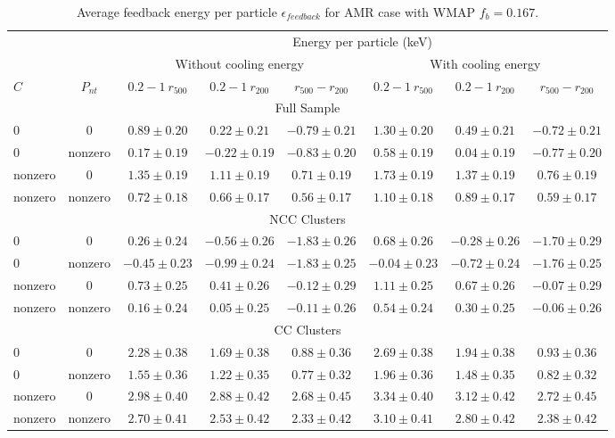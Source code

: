 \documentclass[a4paper,fleqn,usenatbib]{mnras}
\begin{document}
\begin{table*}
 \caption{Average feedback energy per particle $\epsilon_{feedback}$ for AMR case with WMAP $f_{b}=0.167$.}
 \label{amrwmap}
 \begin{tabular}{@{}lccccccc}
  \hline
 &&\multicolumn{6}{c}{Energy per particle (keV) }\\
    \cline{3-8}
&&\multicolumn{3}{c}{Without cooling energy}&\multicolumn{3}{c}{With cooling energy}\\
\cline{3-8}
 $C$    &$P_{nt}$   & $0.2-1~r_{500}$ &   $0.2-1~r_{200}$& $r_{500}-r_{200}$&   $0.2-1~r_{500}$&$0.2-1~r_{200}$&$r_{500}-r_{200}$\\
  \hline
\multicolumn{8}{c}{Full Sample}\\
\hline
 0        &0          &$0.89\pm0.20$    &$ 0.22\pm0.21$  &  $-0.79\pm0.21$  & $1.30\pm0.20$     &$0.49\pm0.21$   & $-0.72\pm0.21$\\
 0        & nonzero   & $0.17\pm0.19$   &$-0.22\pm0.19$  & $-0.83\pm0.20$   & $0.58\pm0.19$    &$0.04\pm0.19$   &  $-0.77\pm0.20$       \\
nonzero   & 0         &$1.35\pm0.19$    &$1.11\pm0.19$   & $ 0.71\pm0.19$    &$1.73\pm0.19$      &$1.37\pm0.19$   &$0.76\pm0.19$\\
nonzero   & nonzero   & $0.72\pm0.18$   &$ 0.66\pm0.17$   &  $0.56\pm0.17$   &$1.10\pm0.18$      &$0.89\pm0.17$   &$0.59\pm0.17$\\
  \hline 
\multicolumn{8}{c}{NCC Clusters}\\
\hline
 0         &0          &$0.26\pm0.24$    & $-0.56\pm0.26$  & $-1.83\pm0.26$ &$ 0.68\pm0.26$     &$-0.28\pm0.26$ &$-1.70\pm0.29$\\
 0         & nonzero   &$-0.45\pm0.23$  &$-0.99\pm0.24$  &$-1.83\pm0.25$  & $-0.04\pm0.23$   &$-0.72\pm0.24$&  $-1.76\pm0.25$       \\
nonzero    & 0         &$0.73\pm0.25$    &$0.41\pm0.26$   & $-0.12\pm0.29$  &$1.11\pm0.25$    &$0.67\pm0.26$ & $-0.07\pm0.29$\\
nonzero    & nonzero   & $0.16\pm0.24$  &$0.05\pm0.25$  &$-0.11\pm0.26$  &$0.54\pm0.24$     &$0.30\pm0.25$ &$-0.06\pm0.26$\\
  \hline 
\multicolumn{8}{c}{CC Clusters}\\
\hline
 0        &0          &$2.28\pm0.38$    &$1.69\pm0.38$  &$0.88\pm0.36$  & $2.69\pm0.38$   &$1.94\pm 0.38$ &$ 0.93\pm0.36$\\
 0        & nonzero   & $1.55\pm0.36$     &$1.22\pm0.35$  &$0.77\pm0.32$  & $1.96\pm0.36$  &$1.48\pm0.35$ &  $ 0.82\pm0.32$       \\
nonzero   & 0         &$2.98\pm0.40$     &$2.88\pm0.42$  & $2.68\pm0.45$ &$3.34\pm0.40$   &$3.12\pm0.42$&$2.72\pm0.45$\\
nonzero   & nonzero   & $2.70\pm0.41$     &$2.53\pm0.42$  &  $2.33\pm0.42$&$3.10\pm0.41$     &$2.80\pm0.42$ &$2.38\pm0.42$\\
  \hline 
\end{tabular}


\end{table*}
\end{document}
